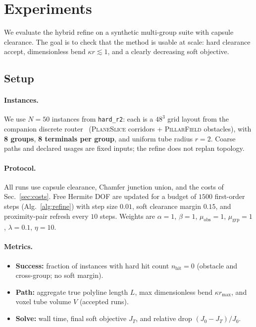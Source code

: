 
\section{Experiments}
\label{sec:experiments}

We evaluate the hybrid refine on a synthetic multi-group suite with capsule
clearance.
The goal is to check that the method is usable at scale: hard clearance accept,
dimensionless bend $\kappa r\lesssim 1$, and a clearly decreasing soft objective.

\subsection{Setup}
\label{sec:exp:setup}

\paragraph{Instances.}
We use $N{=}50$ instances from \texttt{hard\_r2}: each is a $48^3$ grid layout
from the companion discrete router~\cite{deng2025pipe_design}
(\textsc{PlaneSlice} corridors + \textsc{PillarField} obstacles), with
\textbf{8 groups}, \textbf{8 terminals per group}, and uniform tube radius
$r{=}2$.
Coarse paths and declared usages are fixed inputs; the refine does not replan
topology.

\paragraph{Protocol.}
All runs use capsule clearance, Chamfer junction union, and the costs of
Sec.~\ref{sec:costs}.
Free Hermite DOF are updated for a budget of $1500$ first-order steps
(Alg.~\ref{alg:refine}) with step size $0.01$, soft clearance margin $0.15$,
and proximity-pair refresh every $10$ steps.
Weights are
$\alpha{=}1$, $\beta{=}1$, $\mu_{\mathrm{obs}}{=}1$, $\mu_{\mathrm{grp}}{=}1$,
$\lambda{=}0.1$, $\eta{=}10$.

\paragraph{Metrics.}
\begin{itemize}
  \item \textbf{Success:} fraction of instances with hard hit count
        $n_{\mathrm{hit}}=0$ (obstacle and cross-group; no soft margin).
  \item \textbf{Path:} aggregate true polyline length $L$, max dimensionless
        bend $\kappa r_{\max}$, and voxel tube volume $V$ (accepted runs).
  \item \textbf{Solve:} wall time, final soft objective $J_T$, and relative drop
        $(J_0-J_T)/J_0$.
\end{itemize}

